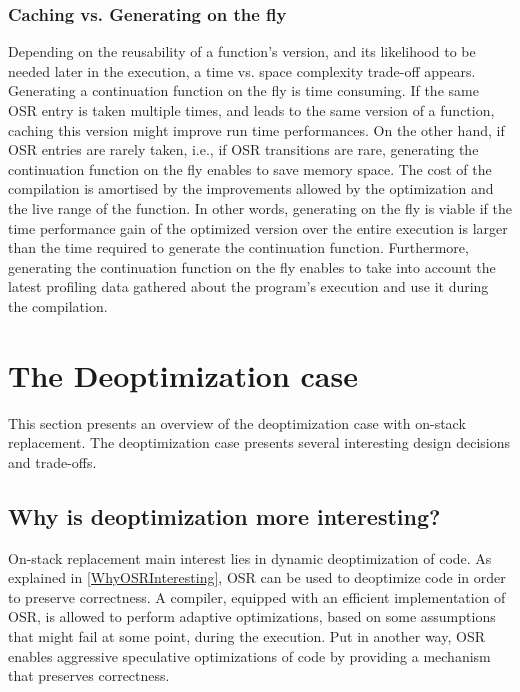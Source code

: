 \subsubsection{Caching vs. Generating on the fly}

Depending on the reusability of a function's version, and its likelihood to be needed later in the execution, a time vs. space complexity trade-off appears.
Generating a continuation function on the fly is time consuming.
If the same OSR entry is taken multiple times, and leads to the same version of a function, caching this version might improve run time performances.
On the other hand, if OSR entries are rarely taken, i.e., if OSR transitions are rare, generating the continuation function on the fly enables to save memory space. 
The cost of the compilation is amortised by the improvements allowed by the optimization and the live range of the function. 
In other words, generating on the fly is viable if the time performance gain of the optimized version over the entire execution is larger than the time required to generate the continuation function.
Furthermore, generating the continuation function on the fly enables to take into account the latest profiling data gathered about the program's execution and use it during the compilation.\\


\section{The Deoptimization case}
This section presents an overview of the deoptimization case with on-stack replacement.
The deoptimization case presents several interesting design decisions and trade-offs.

\subsection{Why is deoptimization more interesting?}\label{WhyDeopt}
On-stack replacement main interest lies in dynamic deoptimization of code.
As explained in \ref{WhyOSRInteresting}, OSR can be used to deoptimize code in order to preserve correctness.
A compiler, equipped with an efficient implementation of OSR, is allowed to perform adaptive optimizations, based on some assumptions that might fail at some point, during the execution.
Put in another way, OSR enables aggressive speculative optimizations of code by providing a mechanism that preserves correctness.\\

